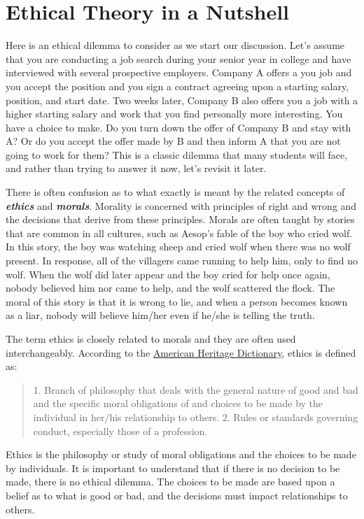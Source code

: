 \section{Ethical Theory in a Nutshell}
\label{section:ethical-theory-in-a-nutshell}

Here is an ethical dilemma to consider as we start our discussion. Let's
assume that you are conducting a job search during your senior year in
college and have interviewed with several prospective employers. Company
A offers a you job and you accept the position and you sign a contract
agreeing upon a starting salary, position, and start date. Two weeks
later, Company B also offers you a job with a higher starting salary and
work that you find personally more interesting. You have a choice to
make. Do you turn down the offer of Company B and stay with A? Or do you
accept the offer made by B and then inform A that you are not going to
work for them? This is a classic dilemma that many students will face,
and rather than trying to answer it now, let's revisit it later.

There is often confusion as to what exactly is meant by the related
concepts of \emph{\textbf{ethics}} and \emph{\textbf{morals}}. Morality
is concerned with principles of right and wrong and the decisions that
derive from these principles. Morals are often taught by stories that
are common in all cultures, such as Aesop's fable of the boy who cried
wolf. In this story, the boy was watching sheep and cried wolf when
there was no wolf present. In response, all of the villagers came
running to help him, only to find no wolf. When the wolf did later
appear and the boy cried for help once again, nobody believed him nor
came to help, and the wolf scattered the flock. The moral of this story
is that it is wrong to lie, and when a person becomes known as a liar,
nobody will believe him/her even if he/she is telling the truth.

The term ethics is closely related to morals and they are often used
interchangeably. According to the \ul{American Heritage Dictionary},
ethics is defined as:

\begin{quote}
1. Branch of philosophy that deals with the general nature of good and
bad and the specific moral obligations of and choices to be made by the
individual in her/his relationship to others. 2. Rules or standards
governing conduct, especially those of a profession.
\end{quote}

Ethics is the philosophy or study of moral obligations and the choices
to be made by individuals. It is important to understand that if there
is no decision to be made, there is no ethical dilemma. The choices to
be made are based upon a belief as to what is good or bad, and the
decisions must impact relationships to others.

